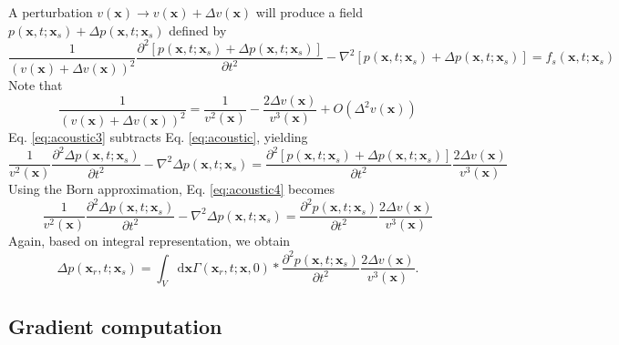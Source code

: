 A perturbation $v(\textbf{x})\rightarrow v(\textbf{x})+\Delta v(\textbf{x})$ will produce a field $p(\textbf{x},t;\textbf{x}_s)+\Delta p(\textbf{x},t;\textbf{x}_s)$ defined by
\begin{equation}\label{eq:acoustic3}
\frac{1}{(v(\textbf{x})+\Delta v(\textbf{x}))^2}\frac{\partial^2 [p(\textbf{x},t;\textbf{x}_s)+\Delta p(\textbf{x},t;\textbf{x}_s)]}{\partial t^2}
-\nabla^2 [p(\textbf{x},t; \textbf{x}_s)+\Delta p(\textbf{x},t;\textbf{x}_s)]
=f_s(\textbf{x},t;\textbf{x}_s)
\end{equation}
Note that
\begin{equation}
\frac{1}{(v(\textbf{x})+\Delta v(\textbf{x}))^2}
=\frac{1}{v^2(\textbf{x})}-\frac{2\Delta v(\textbf{x})}{v^3(\textbf{x})}+O(\Delta^2 v(\textbf{x}))
\end{equation}
Eq. \eqref{eq:acoustic3} subtracts Eq. \eqref{eq:acoustic}, yielding
\begin{equation}\label{eq:acoustic4}
\frac{1}{v^2(\textbf{x})}\frac{\partial^2 \Delta p(\textbf{x},t;\textbf{x}_s)}{\partial t^2}
-\nabla^2 \Delta p(\textbf{x},t;\textbf{x}_s)=
\frac{\partial^2 [p(\textbf{x},t;\textbf{x}_s)+\Delta p(\textbf{x},t;\textbf{x}_s)]}{\partial t^2}\frac{2\Delta v(\textbf{x})}{v^3(\textbf{x})}
\end{equation}
Using the Born approximation, Eq. \eqref{eq:acoustic4} becomes
\begin{equation}\label{eq:acoustic5}
\frac{1}{v^2(\textbf{x})}\frac{\partial^2 \Delta p(\textbf{x},t;\textbf{x}_s)}{\partial t^2}
-\nabla^2 \Delta p(\textbf{x},t;\textbf{x}_s)=
\frac{\partial^2 p(\textbf{x},t;\textbf{x}_s)}{\partial t^2}\frac{2\Delta v(\textbf{x})}{v^3(\textbf{x})}
\end{equation}
Again, based on integral representation, we obtain
\begin{equation}\label{eq:frechet}
\Delta p(\textbf{x}_r,t; \textbf{x}_s)=\int_V \mathrm{d}\textbf{x}\Gamma(\textbf{x}_r,t;\textbf{x},0)*
\frac{\partial^2 p(\textbf{x},t;\textbf{x}_s)}{\partial t^2}\frac{2\Delta v(\textbf{x})}{v^3(\textbf{x})}.
\end{equation}

\subsection{Gradient computation}


